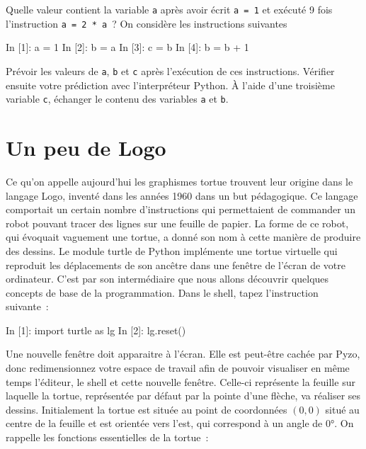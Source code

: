 \documentclass{magnolia}
\begin{document}
\begin{questions}
\question Quelle valeur contient la variable \verb_a_ après avoir écrit \verb_a = 1_ et exécuté 9 fois l'instruction \verb_a = 2 * a_~?
\question On considère les instructions suivantes
\begin{pythoncode}
In [1]: a = 1
In [2]: b = a
In [3]: c = b
In [4]: b = b + 1
\end{pythoncode}
Prévoir les valeurs de \verb_a_, \verb_b_ et \verb_c_ après l'exécution de ces instructions. Vérifier ensuite votre prédiction avec l'interpréteur Python.
\question À l'aide d'une troisième variable \verb_c_, échanger le contenu des variables \verb_a_ et \verb_b_.
\end{questions}



\section{Un peu de Logo}

Ce qu'on appelle aujourd'hui les graphismes \og tortue \fg trouvent leur origine dans le langage Logo, inventé dans
les années 1960 dans un but pédagogique. Ce langage comportait un certain nombre d'instructions qui permettaient de commander
un robot pouvant tracer des lignes sur une feuille de papier. La forme de ce robot, qui évoquait vaguement une tortue, a donné
son nom à cette manière de produire des dessins. Le module turtle de Python implémente une tortue virtuelle qui reproduit les
déplacements de son ancêtre dans une fenêtre de l'écran de votre ordinateur. C'est par son intermédiaire que nous allons
découvrir quelques concepts de base de la programmation. Dans le shell, tapez l'instruction suivante~:

\begin{pythoncode}
In [1]: import turtle as lg
In [2]: lg.reset()
\end{pythoncode}
\noindent
Une nouvelle fenêtre doit apparaitre à l'écran. Elle est peut-être cachée par Pyzo, donc redimensionnez votre espace de
travail afin de pouvoir visualiser en même temps l'éditeur, le shell et cette nouvelle fenêtre. Celle-ci représente
la feuille sur laquelle la tortue, représentée par défaut par la pointe d'une flèche, va réaliser ses dessins. Initialement
la tortue est située au point de coordonnées $(0, 0)$ situé au centre de la feuille et est orientée vers l'est, qui
correspond à un angle de $\ang{0}$. On rappelle les fonctions essentielles de la tortue~:
\end{document}
